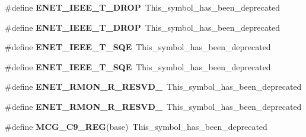 \begin{DoxyCompactItemize}
\item 
\#define {\bfseries E\+N\+E\+T\+\_\+\+I\+E\+E\+E\+\_\+\+T\+\_\+\+D\+R\+OP}~This\+\_\+symbol\+\_\+has\+\_\+been\+\_\+deprecated\hypertarget{group__Backward__Compatibility__Symbols_ga8ae049d1d1c7c61611a6f6ddcf760e96}{}\label{group__Backward__Compatibility__Symbols_ga8ae049d1d1c7c61611a6f6ddcf760e96}

\item 
\#define {\bfseries E\+N\+E\+T\+\_\+\+I\+E\+E\+E\+\_\+\+T\+\_\+\+D\+R\+OP}~This\+\_\+symbol\+\_\+has\+\_\+been\+\_\+deprecated\hypertarget{group__Backward__Compatibility__Symbols_ga8ae049d1d1c7c61611a6f6ddcf760e96}{}\label{group__Backward__Compatibility__Symbols_ga8ae049d1d1c7c61611a6f6ddcf760e96}

\item 
\#define {\bfseries E\+N\+E\+T\+\_\+\+I\+E\+E\+E\+\_\+\+T\+\_\+\+S\+QE}~This\+\_\+symbol\+\_\+has\+\_\+been\+\_\+deprecated\hypertarget{group__Backward__Compatibility__Symbols_ga8129e9ea49a92cf4297418a1be2bcbc0}{}\label{group__Backward__Compatibility__Symbols_ga8129e9ea49a92cf4297418a1be2bcbc0}

\item 
\#define {\bfseries E\+N\+E\+T\+\_\+\+I\+E\+E\+E\+\_\+\+T\+\_\+\+S\+QE}~This\+\_\+symbol\+\_\+has\+\_\+been\+\_\+deprecated\hypertarget{group__Backward__Compatibility__Symbols_ga8129e9ea49a92cf4297418a1be2bcbc0}{}\label{group__Backward__Compatibility__Symbols_ga8129e9ea49a92cf4297418a1be2bcbc0}

\item 
\#define {\bfseries E\+N\+E\+T\+\_\+\+R\+M\+O\+N\+\_\+\+R\+\_\+\+R\+E\+S\+V\+D\+\_}~This\+\_\+symbol\+\_\+has\+\_\+been\+\_\+deprecated\hypertarget{group__Backward__Compatibility__Symbols_ga0b266930d57561032880164a69b9f7b1}{}\label{group__Backward__Compatibility__Symbols_ga0b266930d57561032880164a69b9f7b1}

\item 
\#define {\bfseries E\+N\+E\+T\+\_\+\+R\+M\+O\+N\+\_\+\+R\+\_\+\+R\+E\+S\+V\+D\+\_}~This\+\_\+symbol\+\_\+has\+\_\+been\+\_\+deprecated\hypertarget{group__Backward__Compatibility__Symbols_ga0b266930d57561032880164a69b9f7b1}{}\label{group__Backward__Compatibility__Symbols_ga0b266930d57561032880164a69b9f7b1}

\item 
\#define {\bfseries M\+C\+G\+\_\+\+C9\+\_\+\+R\+EG}(base)~This\+\_\+symbol\+\_\+has\+\_\+been\+\_\+deprecated\hypertarget{group__Backward__Compatibility__Symbols_ga4edaa0cc446f810f9aa01a41f6960573}{}\label{group__Backward__Compatibility__Symbols_ga4edaa0cc446f810f9aa01a41f6960573}


\end{DoxyCompactItemize}

